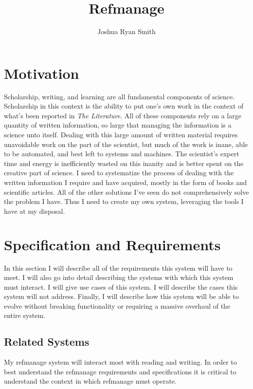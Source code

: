 \documentclass[letterpaper,12pt]{article}
\title{Refmanage}
\author{Joshua Ryan Smith}
\begin{document}
\maketitle




\section{Motivation}
Scholarship, writing, and learning are all fundamental components of science. Scholarship in this context is the ability to put one's own work in the context of what's been reported in \emph{The Literature}. All of these components rely on a large quantity of written information, so large that managing the information is a science unto itself. Dealing with this large amount of written material requires unavoidable work on the part of the scientist, but much of the work is inane, able to be automated, and best left to systems and machines. The scientist's expert time and energy is inefficiently wasted on this inanity and is better spent on the creative part of science. I need to systematize the process of dealing with the written information I require and have acquired, mostly in the form of books and scientific articles. All of the other solutions I've seen do not comprehensively solve the problem I have. Thus I need to create my own system, leveraging the tools I have at my disposal.









\section{Specification and Requirements}
In this section I will describe all of the requirements this system will have to meet. I will also go into detail describing the systems with which this system must interact. I will give use cases of this system. I will describe the cases this system will not address. Finally, I will describe how this system will be able to evolve without breaking functionality or requiring a massive overhaul of the entire system.

\subsection{Related Systems}
My refmanage system will interact most with reading and writing. In order to best understand the refmanage requirements and specifications it is critical to understand the context in which refmanage must operate.
\end{document}
